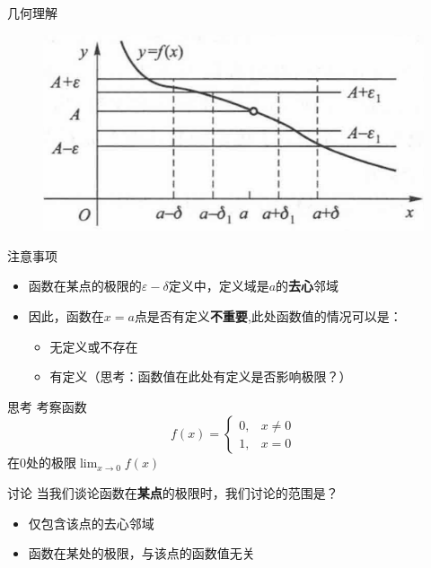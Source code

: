 \documentclass[]{beamer}
\begin{document}
\begin{frame}{几何理解}
    \begin{figure}
        \centering
        \includegraphics[width=0.7\linewidth]{eps-delta-graph.png}
    \end{figure}
\end{frame}

\begin{frame}{注意事项}
    \begin{itemize}
        \item 函数在某点的极限的$\varepsilon-\delta$定义中，定义域是$a$的\textbf{去心}邻域
        \item 因此，函数在$x=a$点是否有定义\textbf{不重要},此处函数值的情况可以是：
        \begin{itemize}
            \item 无定义或不存在
            \item 有定义（思考：函数值在此处有定义是否影响极限？）
        \end{itemize}
    \end{itemize}
\end{frame}

\begin{frame}{思考}
    考察函数
    \[
    f(x)=\left\{
    \begin{array}{ll}
        0, &x\ne0\\
        1, &x = 0
    \end{array}
    \right.
    \]
    在$0$处的极限$\displaystyle\lim_{x\rightarrow0}f(x)$
\end{frame}

\begin{frame}{讨论}
    当我们谈论函数在\textbf{某点}的极限时，我们讨论的范围是？
    \begin{itemize}
        \item 仅包含该点的去心邻域
        \item 函数在某处的极限，与该点的函数值无关
    \end{itemize}
\end{frame}
\end{document}
